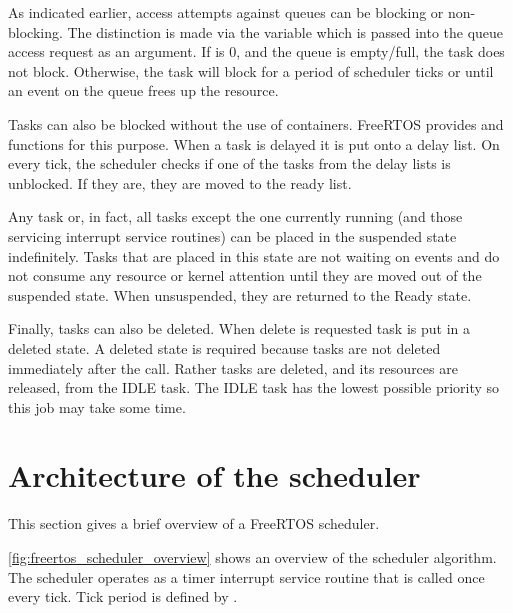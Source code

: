 As indicated earlier, access attempts against queues can be blocking or non-blocking.
The distinction is made via the  variable which is passed into the queue
access request as an argument. If  is 0, and the queue is empty/full, the
task does not block. Otherwise, the task will block for a period of 
scheduler ticks or until an event on the queue frees up the resource.

Tasks can also be blocked without the use of containers. FreeRTOS provides  and  functions for this purpose. When a task is delayed it is put onto a delay list. On every tick, the scheduler checks if one of the tasks from the delay lists is unblocked. If they are, they are moved to the ready list.

Any task or, in fact, all tasks except the one currently running (and those servicing interrupt service routines)
can be placed in the suspended state indefinitely. Tasks that are placed in this state are
not waiting on events and do not consume any resource or kernel attention until they are
moved out of the suspended state. When unsuspended, they are returned to the Ready state.

Finally, tasks can also be deleted. When delete is requested task is put in a deleted state. A deleted state is required because tasks are not deleted immediately after the call. Rather tasks are deleted, and its resources are released, from the IDLE task. The IDLE task has the lowest possible priority so this job may take some time.

\section{Architecture of the scheduler}

This section gives a brief overview of a FreeRTOS scheduler.

\autoref{fig:freertos_scheduler_overview} shows an overview of the scheduler algorithm. The scheduler operates as a timer interrupt service routine that is called once every tick. Tick period is defined by . 


